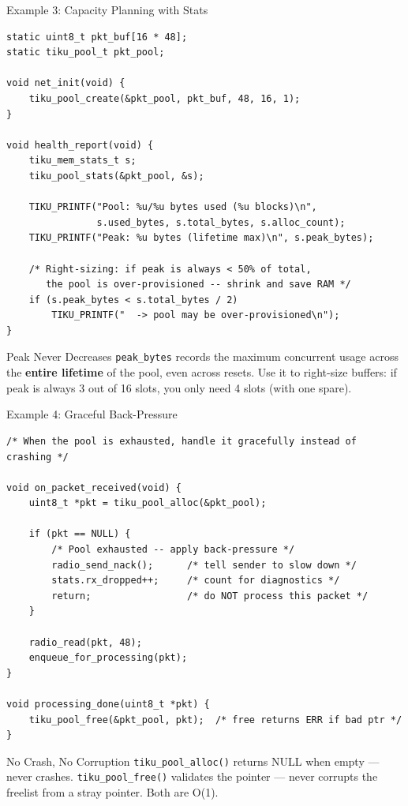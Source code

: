 \documentclass[aspectratio=169, 10pt]{beamer}
\begin{document}
\begin{frame}[fragile]{Example 3: Capacity Planning with Stats}
\begin{lstlisting}[style=cstyle]
static uint8_t pkt_buf[16 * 48];
static tiku_pool_t pkt_pool;

void net_init(void) {
    tiku_pool_create(&pkt_pool, pkt_buf, 48, 16, 1);
}

void health_report(void) {
    tiku_mem_stats_t s;
    tiku_pool_stats(&pkt_pool, &s);

    TIKU_PRINTF("Pool: %u/%u bytes used (%u blocks)\n",
                s.used_bytes, s.total_bytes, s.alloc_count);
    TIKU_PRINTF("Peak: %u bytes (lifetime max)\n", s.peak_bytes);

    /* Right-sizing: if peak is always < 50% of total,
       the pool is over-provisioned -- shrink and save RAM */
    if (s.peak_bytes < s.total_bytes / 2)
        TIKU_PRINTF("  -> pool may be over-provisioned\n");
}
\end{lstlisting}

\begin{block}{Peak Never Decreases}
\texttt{peak\_bytes} records the maximum concurrent usage across the
\textbf{entire lifetime} of the pool, even across resets. Use it to
right-size buffers: if peak is always 3 out of 16 slots, you only
need 4 slots (with one spare).
\end{block}
\end{frame}

\begin{frame}[fragile]{Example 4: Graceful Back-Pressure}
\begin{lstlisting}[style=cstyle]
/* When the pool is exhausted, handle it gracefully instead of crashing */

void on_packet_received(void) {
    uint8_t *pkt = tiku_pool_alloc(&pkt_pool);

    if (pkt == NULL) {
        /* Pool exhausted -- apply back-pressure */
        radio_send_nack();      /* tell sender to slow down */
        stats.rx_dropped++;     /* count for diagnostics */
        return;                 /* do NOT process this packet */
    }

    radio_read(pkt, 48);
    enqueue_for_processing(pkt);
}

void processing_done(uint8_t *pkt) {
    tiku_pool_free(&pkt_pool, pkt);  /* free returns ERR if bad ptr */
}
\end{lstlisting}

\begin{alertblock}{No Crash, No Corruption}
\texttt{tiku\_pool\_alloc()} returns NULL when empty --- never crashes.
\texttt{tiku\_pool\_free()} validates the pointer --- never corrupts the
freelist from a stray pointer. Both are O(1).
\end{alertblock}
\end{frame}
\end{document}
